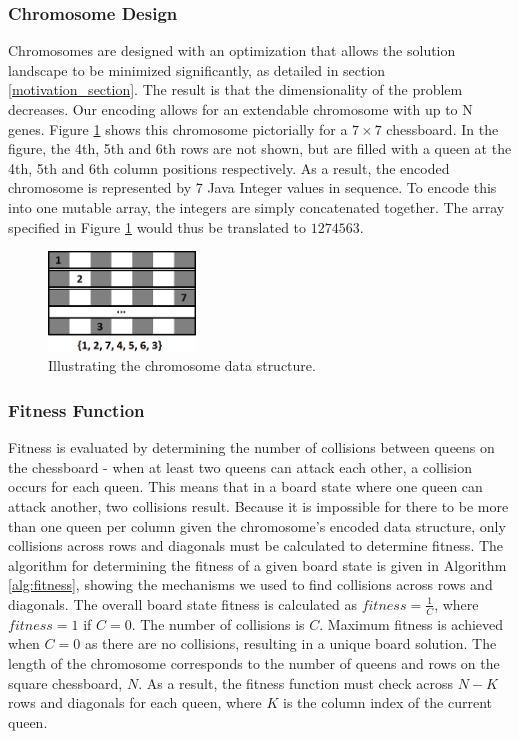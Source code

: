 \documentclass{sig-alternate}
\begin{document}
\subsubsection{Chromosome Design}
Chromosomes are designed with an optimization that allows the solution landscape to be minimized significantly, as detailed in section \ref{motivation_section}. The result is that the dimensionality of the problem decreases. Our encoding allows for an extendable chromosome with up to N genes. Figure \ref{fig:chromosome} shows this chromosome pictorially for a $7 \times 7$ chessboard. In the figure, the 4th, 5th and 6th rows are not shown, but are filled with a queen at the 4th, 5th and 6th column positions respectively. As a result, the encoded chromosome is represented by 7 Java Integer values in sequence. To encode this into one mutable array, the integers are simply concatenated together. The array specified in Figure \ref{fig:chromosome} would thus be translated to $1274563$.

\begin{figure}[h]
\centering
\includegraphics[width=0.35\textwidth]{chromosome.png}
\vspace{-12pt}
\caption{Illustrating the chromosome data structure.}
\label{fig:chromosome}
\end{figure}

\subsubsection{Fitness Function}
Fitness is evaluated by determining the number of collisions between queens on the chessboard - when at least two queens can attack each other, a collision occurs for each queen. This means that in a board state where one queen can attack another, two collisions result. Because it is impossible for there to be more than one queen per column given the chromosome's encoded data structure, only collisions across rows and diagonals must be calculated to determine fitness. The algorithm for determining the fitness of a given board state is given in Algorithm \ref{alg:fitness}, showing the mechanisms we used to find collisions across rows and diagonals. The overall board state fitness is calculated as $fitness = \frac{1}{C}$, where $fitness = 1$ if $C = 0$. The number of collisions is $C$. Maximum fitness is achieved when $C = 0$ as there are no collisions, resulting in a unique board solution. The length of the chromosome corresponds to the number of queens and rows on the square chessboard, $N$. As a result, the fitness function must check across $N - K$ rows and diagonals for each queen, where $K$ is the column index of the current queen.
 
\end{document}
